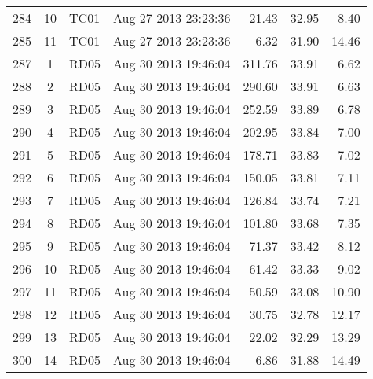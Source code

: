 \begin{longtable}{ccllrrr}
284&10&TC01&Aug 27 2013 23:23:36&21.43&32.95&8.40\\
285&11&TC01&Aug 27 2013 23:23:36&6.32&31.90&14.46\\
\hline 
287&1&RD05&Aug 30 2013 19:46:04&311.76&33.91&6.62\\
288&2&RD05&Aug 30 2013 19:46:04&290.60&33.91&6.63\\
289&3&RD05&Aug 30 2013 19:46:04&252.59&33.89&6.78\\
290&4&RD05&Aug 30 2013 19:46:04&202.95&33.84&7.00\\
291&5&RD05&Aug 30 2013 19:46:04&178.71&33.83&7.02\\
292&6&RD05&Aug 30 2013 19:46:04&150.05&33.81&7.11\\
293&7&RD05&Aug 30 2013 19:46:04&126.84&33.74&7.21\\
294&8&RD05&Aug 30 2013 19:46:04&101.80&33.68&7.35\\
295&9&RD05&Aug 30 2013 19:46:04&71.37&33.42&8.12\\
296&10&RD05&Aug 30 2013 19:46:04&61.42&33.33&9.02\\
297&11&RD05&Aug 30 2013 19:46:04&50.59&33.08&10.90\\
298&12&RD05&Aug 30 2013 19:46:04&30.75&32.78&12.17\\
299&13&RD05&Aug 30 2013 19:46:04&22.02&32.29&13.29\\
300&14&RD05&Aug 30 2013 19:46:04&6.86&31.88&14.49\\
\hline 

 \end{longtable} 

